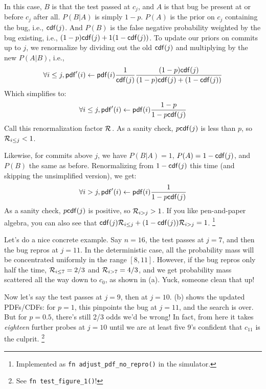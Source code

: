 \documentclass[11pt]{sigplanconf}
\begin{document}
In this case, $B$ is that the test passed at $c_j$, and $A$ is that bug be present at or before $c_j$ after all.
$P(B|A)$ is simply $1-p$.
$P(A)$ is the prior on $c_j$ containing the bug, i.e., $\mathsf{cdf}(j)$.
And $P(B)$ is the false negative probability weighted by the bug existing, i.e., $(1-p)\mathsf{cdf}(j) + 1(1-\mathsf{cdf}(j))$.
To update our priors on commits up to $j$, we renormalize by dividing out the old $\mathsf{cdf}(j)$
and multiplying by the new $P(A|B)$, i.e.,
\[
	\forall i \le j, \mathsf{pdf}'(i)
	\leftarrow
	\mathsf{pdf}(i)
	\frac{1}{\mathsf{cdf}(j)}
	\frac{(1-p)\mathsf{cdf}(j)}{(1-p)\mathsf{cdf}(j) + (1-\mathsf{cdf}(j))}
\]
Which simplifies to:
\[
	\forall i \le j, \mathsf{pdf}'(i)
	\leftarrow
	\mathsf{pdf}(i)
	\frac{1-p}{1 - p\mathsf{cdf}(j)}
\]
Call this renormalization factor $\mathcal{R}_{}$.
As a sanity check, $p\mathsf{cdf}(j)$ is less than $p$, so $\mathcal{R}_{i\le j} < 1$.

Likewise, for commits above $j$, we have $P(B|A) = 1$, $P(A) = 1-\mathsf{cdf}(j)$, and $P(B)$ the same as before.
Renormalizing from $1-\mathsf{cdf}(j)$ this time (and skipping the unsimplified version), we get:
\[
	\forall i > j, \mathsf{pdf}'(i)
	\leftarrow
	\mathsf{pdf}(i)
	\frac{1}{1 - p\mathsf{cdf}(j)}
\]
As a sanity check, $p\mathsf{cdf}(j)$ is positive, so $\mathcal{R}_{i > j} > 1$.
If you like pen-and-paper algebra, you can also see that
$
\mathsf{cdf}(j)
\mathcal{R}_{i \le j}
+
(1-\mathsf{cdf}(j))
\mathcal{R}_{i>j}
= 1$.%
\footnote{Implemented as {\tt fn adjust\_pdf\_no\_repro()} in the simulator.}


Let's do a nice concrete example.
Say $n=16$, the test passes at $j=7$, and then the bug repros at $j=11$.
In the deterministic case, all the probability mass will be concentrated uniformly in the range $[8,11]$.
However, if the bug repros only half the time,
$\mathcal{R}_{i \le 7} = 2/3$
and
$\mathcal{R}_{i > 7} = 4/3$,
and we get probability mass scattered all the way down to $c_0$,
as shown in (a).
Yuck, someone clean that up!

Now let's say the test passes at $j=9$, then at $j=10$.
(b) shows the updated PDFs/CDFs:
for $p=1$, this pinpoints the bug at $j=11$, and the search is over.
But for $p=0.5$, there's still 2/3 odds we'd be wrong!
In fact, from here it takes {\it eighteen} further probes at $j=10$ until we are at least five 9's confident that $c_{11}$ is the culprit.%
\footnote{See {\tt fn test\_figure\_1()}!}
\end{document}
